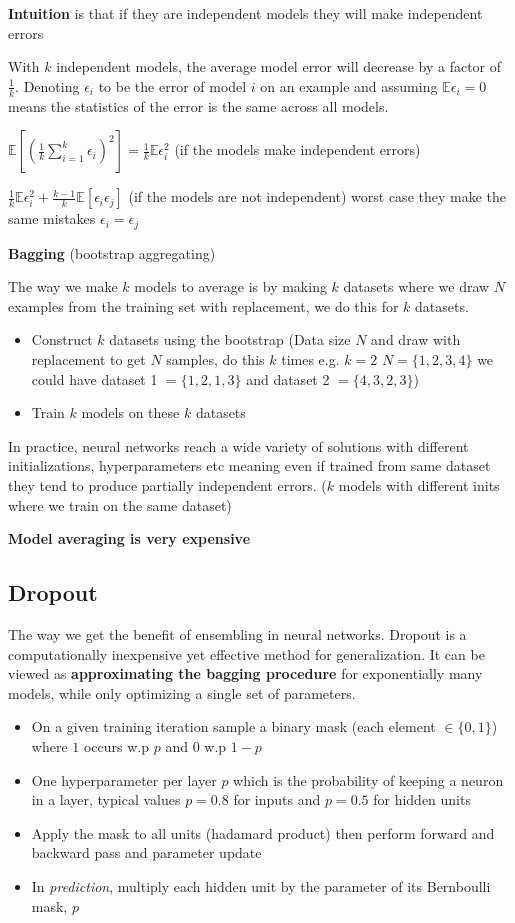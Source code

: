 \documentclass[twocolumn, letter, 10pt, landscape]{article}
\newcommand{\tb}{\textbf}
\newcommand{\ti}{\textit}
\newcommand{\bit}{\vspace{-0.1in}\begin{itemize}\setlength\itemsep{-0.05in}}
\newcommand{\eit}{\end{itemize}\vspace{-0.1in}}
\newcommand{\ex}{\mathbb{E}}
\begin{document}
\tb{Intuition} is that if they are independent models they will make independent errors

With $k$ independent models, the average model error will decrease by a factor of $\frac{1}{k}$. Denoting $\epsilon_i$ to be the error of model $i$ on an example and assuming $\ex\epsilon_i=0$ means the statistics of the error is the same across all models.

$\ex[(\frac{1}{k}\sum_{i=1}^k\epsilon_i)^2] = \frac{1}{k}\ex\epsilon_i^2$ (if the models make independent errors)

$\frac{1}{k}\ex\epsilon_i^2+\frac{k-1}{k}\ex[\epsilon_i\epsilon_j]$ (if the models are not independent) worst case they make the same mistakes $\epsilon_i= \epsilon_j$

\tb{Bagging} (bootstrap aggregating)

The way we make $k$ models to average is by making $k$ datasets where we draw $N$ examples from the training set with replacement, we do this for $k$ datasets.

\bit{}
\item Construct $k$ datasets using the bootstrap (Data size $N$ and draw with replacement to get $N$ samples, do this $k$ times e.g. $k=2$ $N=\{1,2,3,4\}$ we could have dataset 1 $=\{1,2,1,3\}$ and dataset 2 $=\{4,3,2,3\}$)
\item Train $k$ models on these $k$ datasets
\eit{}
In practice, neural networks reach a wide variety of solutions with different initializations, hyperparameters etc meaning even if trained from same dataset they tend to produce partially independent errors. ($k$ models with different inits where we train on the same dataset)

\tb{Model averaging is very expensive}

\subsection{Dropout}
The way we get the benefit of ensembling in neural networks. Dropout is a computationally inexpensive yet effective method for generalization. It can be viewed as \tb{approximating the bagging procedure} for exponentially many models, while only optimizing a single set of parameters.

\bit{}
\item On a given training iteration sample a binary mask (each element $\in\{0,1\}$) where $1$ occurs w.p $p$ and $0$ w.p $1-p$
\item One hyperparameter per layer $p$ which is the probability of keeping a neuron in a layer, typical values $p=0.8$ for inputs and $p=0.5$ for hidden units
\item Apply the mask to all units (hadamard product) then perform forward and backward pass and parameter update
\item In \ti{prediction}, multiply each hidden unit by the parameter of its Bernboulli mask, $p$
\eit{}
\end{document}
